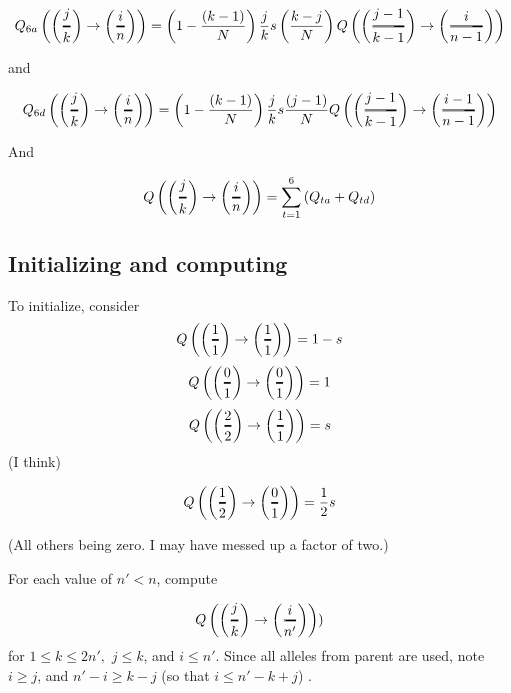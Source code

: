 \documentclass[]{article}
\newcommand{\Dfrac}[2]{%
  \ooalign{%
    $\left(\genfrac{}{}{1.2pt}0{#1}{#2}\right)$\cr%
    $\color{white}\genfrac{}{}{.4pt}0{\phantom{#1}}{\phantom{#2}}$}%
}
\begin{document}
$$Q_{6a}\left(\Dfrac{j}{k} \rightarrow \Dfrac{i}{n} \right) = \left(1-\frac{(k-1)}{N}\right) \frac{j}{k} s  \left(\frac{ k-j }{N}\right)  
Q\left(\Dfrac{j-1}{k-1} \rightarrow \Dfrac{i}{n-1} \right) $$
 
 and 
 
$$Q_{6d}\left(\Dfrac{j}{k} \rightarrow \Dfrac{i}{n} \right) =\left(1-\frac{(k-1)}{N}\right) \frac{j}{k} s \frac{(j-1)}{N}  
Q\left(\Dfrac{j-1}{k-1} \rightarrow \Dfrac{i-1}{n-1} \right)  $$


And 

$$Q\left(\Dfrac{j}{k} \rightarrow \Dfrac{i}{n} \right) = \sum_{t=1}^6  \left( Q_{ta}+ Q_{td} \right)$$


\subsection{Initializing and computing}

To initialize, consider 
$$Q\left(\Dfrac{1}{1} \rightarrow \Dfrac{1}{1} \right) = 1-s$$
$$Q\left(\Dfrac{0}{1} \rightarrow \Dfrac{0}{1} \right) = 1$$
$$Q\left(\Dfrac{2}{2} \rightarrow \Dfrac{1}{1} \right) = s$$ (I think)

$$Q\left(\Dfrac{1}{2} \rightarrow \Dfrac{0}{1} \right) = \frac{1}{2}s $$

(All others being zero. I may have messed up a factor of two.)

For each value of $n'<n$, compute 

$$Q\left(\Dfrac{j}{k} \rightarrow \Dfrac{i}{n'} \right) )$$
for $1\leq k\leq 2 n',$ $j\leq k$, and $i \leq n'.$ Since all alleles from parent are used, note $i\geq j$, and $n'-i \geq k-j$ (so that $i \leq n'-k+j$) .








 
\end{document}
